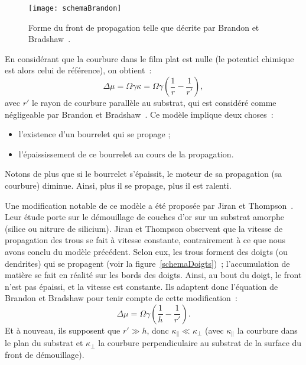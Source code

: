 \begin{figure}[!htb]
	\centering
	\texttt{[image: schemaBrandon]}
	\caption{Forme du front de propagation telle que décrite par Brandon et Bradshaw~\cite{brandon1966mobility}.}
	\label{schemaBrandon}
\end{figure}

En considérant que la courbure dans le film plat est nulle (le potentiel chimique est alors celui de référence), on obtient~:
\begin{equation}
\Delta \mu = \Omega\gamma\kappa = \Omega\gamma\left(\dfrac{1}{r}-\dfrac{1}{r'}\right),
\end{equation}
avec $r'$ le rayon de courbure parallèle au substrat, qui est considéré comme négligeable par Brandon et Bradshaw~\cite{brandon1966mobility}. Ce modèle implique deux choses~:
\begin{itemize}
\item l'existence d'un bourrelet qui se propage ;
\item l'épaississement de ce bourrelet au cours de la propagation.
\end{itemize}
Notons de plus que si le bourrelet s'épaissit, le moteur de sa propagation (sa courbure) diminue. Ainsi, plus il se propage, plus il est ralenti.\par 
Une modification notable de ce modèle a été proposée par Jiran et Thompson~\cite{jiran1990capillary, jiran1992capillary}. Leur étude porte sur le démouillage de couches d'or sur un substrat amorphe (silice ou nitrure de silicium). Jiran et Thompson observent que la vitesse de propagation des trous se fait à vitesse constante, contrairement à ce que nous avons conclu du modèle précédent. Selon eux, les trous forment des doigts (ou dendrites) qui se propagent (voir la figure~\ref{schemaDoigts})~; l'accumulation de matière se fait en réalité sur les bords des doigts. Ainsi, au bout du doigt, le front n'est pas épaissi, et la vitesse est constante. Ils adaptent donc l'équation de Brandon et Bradshaw pour tenir compte de cette modification~:
\begin{equation}
\Delta \mu = \Omega\gamma\left(\dfrac{1}{h}-\dfrac{1}{r'}\right).
\end{equation}
Et à nouveau, ils supposent que $r' \gg h$, donc $\kappa_\parallel \ll \kappa_\perp$ (avec $\kappa_\parallel$ la courbure dans le plan du substrat et $\kappa_\perp$ la courbure perpendiculaire au substrat de la surface du front de démouillage).\par 

